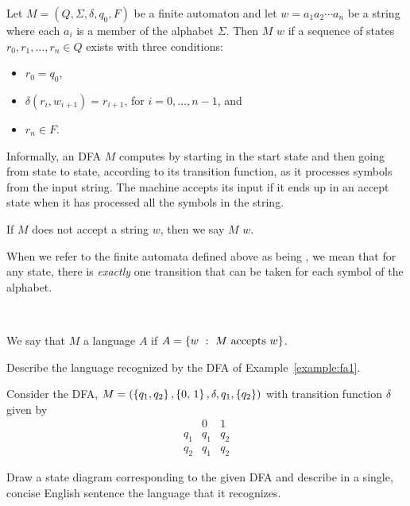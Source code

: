 \documentclass[twoside,letterpaper,openany]{book}
\begin{document}
\begin{defn}
Let $M = (Q, \Sigma, \delta, q_0, F)$ be a finite automaton and let $w = a_1a_2\cdots a_n$ be a string where each $a_i$ is a member of the alphabet $\Sigma$. Then $M$  $w$ if a sequence of states $r_0, r_1, \ldots, r_n \in Q$ exists with three conditions:
\begin{itemize}
\item $r_0 = q_0$,
\item $\delta(r_i, w_{i+1}) = r_{i+1}$, for $i = 0, \ldots, n-1$, and
\item $r_n \in F$.
\end{itemize}

Informally, an DFA $M$ computes by starting in the start state and then going from state to state, according to its transition function, as it processes symbols from the input string. The machine accepts its input if it ends up in an accept state when it has processed all the symbols in the string.

If $M$ does not accept a string $w$, then we say $M$  $w$.
\end{defn}

\begin{discussion}
When we refer to the finite automata  defined above as being , we mean that for any state, there is \emph{exactly} one transition that can be taken for each symbol of the alphabet.
\end{discussion}

~

\begin{defn}
We say that $M$  a language $A$ if $A = \setbuild{w}{M \ \textrm{accepts}\ w}$.
\end{defn}

\begin{exer}
Describe the language recognized by the DFA of Example~\ref{example:fa1}.
\end{exer}

\begin{exer}
Consider the DFA, $M = (\left\lbrace q_1, q_2 \right\rbrace, \left\lbrace \textrm{0, 1} \right\rbrace, \delta, q_1, \left\lbrace q_2 \right\rbrace)$ with transition function $\delta$ given by
\[\begin{array}{c|cc}
 & \textrm{0} & \textrm{1} \\ \hline
 q_1 & q_1 & q_2 \\
 q_2 & q_1 & q_2
\end{array}\]

Draw a state diagram corresponding to the given DFA and describe in a single, concise English sentence the language that it recognizes.
\end{exer}
\end{document}
